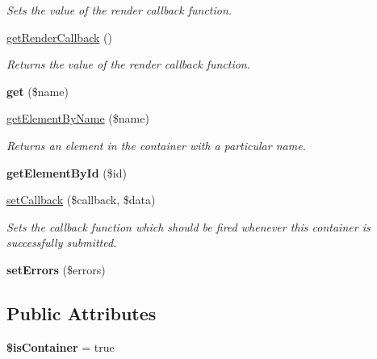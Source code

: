 \begin{DoxyCompactItemize}
\begin{DoxyCompactList}\small\item\em Sets the value of the render callback function. \item\end{DoxyCompactList}\item 
\hypertarget{class_container_a4d95da9bf6d080a0bff8519e8dcba75e}{
\hyperlink{class_container_a4d95da9bf6d080a0bff8519e8dcba75e}{getRenderCallback} ()}
\label{class_container_a4d95da9bf6d080a0bff8519e8dcba75e}

\begin{DoxyCompactList}\small\item\em Returns the value of the render callback function. \item\end{DoxyCompactList}\item 
\hypertarget{class_container_ace0980da5d8cd21e72d7c41be4c05176}{
{\bfseries get} (\$name)}
\label{class_container_ace0980da5d8cd21e72d7c41be4c05176}

\item 
\hyperlink{class_container_ae37e0de362e6503ddcd5185895a14f50}{getElementByName} (\$name)
\begin{DoxyCompactList}\small\item\em Returns an element in the container with a particular name. \item\end{DoxyCompactList}\item 
\hypertarget{class_container_a797e7cde3da02db2d2167ca3c4cd13f4}{
{\bfseries getElementById} (\$id)}
\label{class_container_a797e7cde3da02db2d2167ca3c4cd13f4}

\item 
\hyperlink{class_container_adc89e974c4179d171c9399840d382c92}{setCallback} (\$callback, \$data)
\begin{DoxyCompactList}\small\item\em Sets the callback function which should be fired whenever this container is successfully submitted. \item\end{DoxyCompactList}\item 
\hypertarget{class_container_a4e6d23c9111d47451ecf468d0988a426}{
{\bfseries setErrors} (\$errors)}
\label{class_container_a4e6d23c9111d47451ecf468d0988a426}

\end{DoxyCompactItemize}
\subsection*{Public Attributes}
\begin{DoxyCompactItemize}
\item 
\hypertarget{class_container_a5047c5af49af8252e2b6accb881590b8}{
{\bfseries \$isContainer} = true}
\label{class_container_a5047c5af49af8252e2b6accb881590b8}

\end{DoxyCompactItemize}
